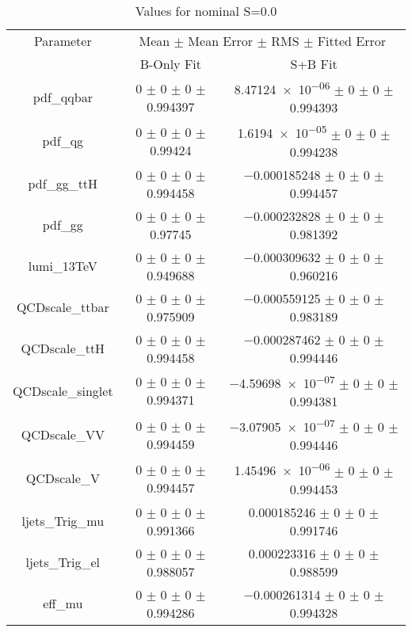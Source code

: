 \begin{table}
\centering
\caption{Values for nominal S=0.0}
\begin{tabular}{ccc}
\toprule
Parameter 	& \multicolumn{2}{c}{Mean $\pm$ Mean Error $\pm$ RMS $\pm$ Fitted Error}\\
 	& B-Only Fit & S+B Fit\\
\midrule
pdf\_qqbar 	& \num{0} $\pm$ \num{0} $\pm$ \num{0} $\pm$ \num{0.994397} 	& \num{8.47124e-06} $\pm$ \num{0} $\pm$ \num{0} $\pm$ \num{0.994393}\\
pdf\_qg 	& \num{0} $\pm$ \num{0} $\pm$ \num{0} $\pm$ \num{0.99424} 	& \num{1.6194e-05} $\pm$ \num{0} $\pm$ \num{0} $\pm$ \num{0.994238}\\
pdf\_gg\_ttH 	& \num{0} $\pm$ \num{0} $\pm$ \num{0} $\pm$ \num{0.994458} 	& \num{-0.000185248} $\pm$ \num{0} $\pm$ \num{0} $\pm$ \num{0.994457}\\
pdf\_gg 	& \num{0} $\pm$ \num{0} $\pm$ \num{0} $\pm$ \num{0.97745} 	& \num{-0.000232828} $\pm$ \num{0} $\pm$ \num{0} $\pm$ \num{0.981392}\\
lumi\_13TeV 	& \num{0} $\pm$ \num{0} $\pm$ \num{0} $\pm$ \num{0.949688} 	& \num{-0.000309632} $\pm$ \num{0} $\pm$ \num{0} $\pm$ \num{0.960216}\\
QCDscale\_ttbar 	& \num{0} $\pm$ \num{0} $\pm$ \num{0} $\pm$ \num{0.975909} 	& \num{-0.000559125} $\pm$ \num{0} $\pm$ \num{0} $\pm$ \num{0.983189}\\
QCDscale\_ttH 	& \num{0} $\pm$ \num{0} $\pm$ \num{0} $\pm$ \num{0.994458} 	& \num{-0.000287462} $\pm$ \num{0} $\pm$ \num{0} $\pm$ \num{0.994446}\\
QCDscale\_singlet 	& \num{0} $\pm$ \num{0} $\pm$ \num{0} $\pm$ \num{0.994371} 	& \num{-4.59698e-07} $\pm$ \num{0} $\pm$ \num{0} $\pm$ \num{0.994381}\\
QCDscale\_VV 	& \num{0} $\pm$ \num{0} $\pm$ \num{0} $\pm$ \num{0.994459} 	& \num{-3.07905e-07} $\pm$ \num{0} $\pm$ \num{0} $\pm$ \num{0.994446}\\
QCDscale\_V 	& \num{0} $\pm$ \num{0} $\pm$ \num{0} $\pm$ \num{0.994457} 	& \num{1.45496e-06} $\pm$ \num{0} $\pm$ \num{0} $\pm$ \num{0.994453}\\
ljets\_Trig\_mu 	& \num{0} $\pm$ \num{0} $\pm$ \num{0} $\pm$ \num{0.991366} 	& \num{0.000185246} $\pm$ \num{0} $\pm$ \num{0} $\pm$ \num{0.991746}\\
ljets\_Trig\_el 	& \num{0} $\pm$ \num{0} $\pm$ \num{0} $\pm$ \num{0.988057} 	& \num{0.000223316} $\pm$ \num{0} $\pm$ \num{0} $\pm$ \num{0.988599}\\
eff\_mu 	& \num{0} $\pm$ \num{0} $\pm$ \num{0} $\pm$ \num{0.994286} 	& \num{-0.000261314} $\pm$ \num{0} $\pm$ \num{0} $\pm$ \num{0.994328}\\

\end{tabular}
\end{table}
